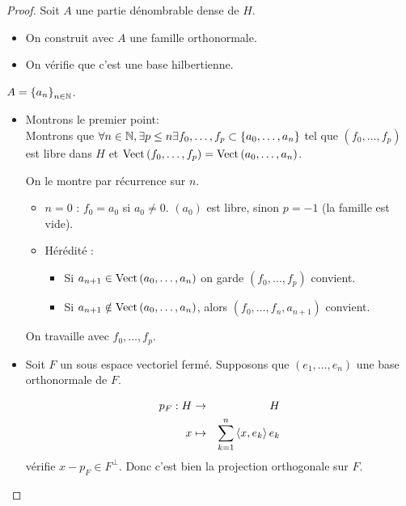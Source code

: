 \begin{proof}
	Soit $A$ une partie dénombrable dense de $H$.

	\begin{itemize}
		\item On construit avec $A$ une famille orthonormale.
		\item On vérifie que c'est une base hilbertienne.
	\end{itemize}

	$A = \left\{ a_n \right\}_{n\in \mathbb{N}}$.

	\begin{itemize}
		\item Montrons le premier point:\\

		      Montrons que $\forall n \in \mathbb{N}, \exists p \leq n \exists f_0, \dots, f_p \subset \left\{a_0, \dots, a_n\right\}$ tel que $(f_0, \dots, f_p)$ est libre dans $H$ et $\text{Vect}\left( f_0, \dots, f_p \right) = \text{Vect}\left( a_0, \dots, a_n \right)$.

		      On le montre par récurrence sur $n$.

		      \begin{itemize}
			      \item $n=0$ : $f_0 = a_0$ si $a_0 \neq 0$. $(a_0)$ est libre, sinon $p = -1$ (la famille est vide).
			      \item Hérédité :
			            \begin{itemize}
				            \item Si $a_{n+1} \in \text{Vect}\left( a_0, \dots , a_n \right)$ on garde $(f_0, \dots, f_p)$ convient.
				            \item Si $a_{n+1} \notin \text{Vect}\left( a_0, \dots , a_n \right)$, alors $(f_0, \dots, f_n, a_{n+1})$ convient.
			            \end{itemize}
		      \end{itemize}

		      On travaille avec $f_0, \dots, f_p$.
		\item Soit $F$ un sous espace vectoriel fermé. Supposons que $(e_1, \dots, e_n)$ une base orthonormale de $F$.

		      \begin{eqnarray*}
			      p_F: H & \to & H \\
			      x & \mapsto & \sum_{k=1}^n \left\langle x, e_k \right\rangle e_k
		      \end{eqnarray*}
		      vérifie $x - p_F \in F^{\perp}$. Donc c'est bien la projection orthogonale sur $F$.


\end{itemize}
\end{proof}
